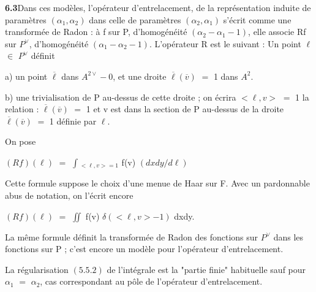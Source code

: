 \documentclass[10pt,a4paper]{article}
\begin{document}
\clearpage
{}
\label{d035-physical-029}
\par\noindent\textbf{6.3}\quad Dans ces modèles, l'opérateur d'entrelacement, de la représentation induite de paramètres $(\alpha{}_1,\alpha{}_2)$ dans celle de paramètres $(\alpha{}_2,\alpha{}_1)$ s'écrit comme une transformée de Radon : à f sur P, d'homogénéité $(\alpha{}_2-\alpha{}_1-1)$, elle associe Rf sur $P^\vee{}$, d'homogénéité $(\alpha{}_1-\alpha{}_2-1)$. L'opérateur R est le suivant : Un point $\ell{}$ $\in{}$ $P^\vee{}$ définit\par
\par a) un point $\overline{\ell{}}$ dans $A^{2\vee{}}-{0}$, et une droite $\overline{\ell{}}(\overline{v})$ $=$ 1 dans $A^2$.\par
\par b) une trivialisation de P au-dessus de cette droite ; on écrira $<\ell{},v>$ $=$ 1 la relation : $\overline{\ell{}}(\overline{v})$ $=$ 1 et v est dans la section de P au-dessus de la droite $\overline{\ell{}}(\overline{v})$ $=$ 1 définie par $\ell{}$.\par
\par On pose\par
\par\smallskip\begin{center}\begin{minipage}{0.96\textwidth}\centering
$(Rf)(\ell{})$ $=$ $\int{}_{<\ell{},v>=1}$ f(v) $(dxdy/d\ell{})$
\end{minipage}\end{center}\smallskip
\par Cette formule suppose le choix d'une menue de Haar sur F. Avec un pardonnable abus de notation, on l'écrit encore\par
\par\smallskip\begin{center}\begin{minipage}{0.96\textwidth}\centering
$(Rf)(\ell{})$ $=$ $\iint{}$ f(v) $\delta{}(<\ell{},v>-1)$ dxdy.
\end{minipage}\end{center}\smallskip
\par La même formule définit la transformée de Radon des fonctions sur $P^\vee{}$ dans les fonctions sur P ; c'est encore un modèle pour l'opérateur d'entrelacement.\par
\par La régularisation $(5.5.2)$ de l'intégrale est la "partie finie" habituelle sauf pour $\alpha{}_1$ $=$ $\alpha{}_2$, cas correspondant au pôle de l'opérateur d'entrelacement.\par
\end{document}

